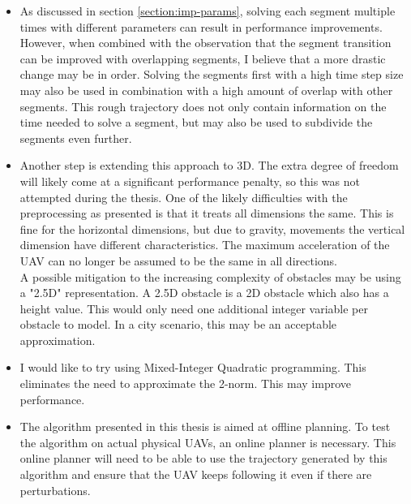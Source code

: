 \begin{itemize}
\item As discussed in section \ref{section:imp-params}, solving each segment multiple times with different parameters can result in performance improvements. However, when combined with the observation that the segment transition can be improved with overlapping segments, I believe that a more drastic change may be in order. Solving the segments first with a high time step size may also be used in combination with a high amount of overlap with other segments. This rough trajectory does not only contain information on the time needed to solve a segment, but may also be used to subdivide the segments even further.
\item Another step is extending this approach to 3D. The extra degree of freedom will likely come at a significant performance penalty, so this was not attempted during the thesis. One of the likely difficulties with the preprocessing as presented is that it treats all dimensions the same. This is fine for the horizontal dimensions, but due to gravity, movements the vertical dimension have different characteristics. The maximum acceleration of the UAV can no longer be assumed to be the same in all directions.\\
A possible mitigation to the increasing complexity of obstacles may be using a "2.5D" representation. A 2.5D obstacle is a 2D obstacle which also has a height value. This would only need one additional integer variable per obstacle to model. In a city scenario, this may be an acceptable approximation.
\item I would like to try using Mixed-Integer Quadratic programming. This eliminates the need to approximate the 2-norm. This may improve performance. \\
\item The algorithm presented in this thesis is aimed at offline planning. To test the algorithm on actual physical UAVs, an online planner is necessary. This online planner will need to be able to use the trajectory generated by this algorithm and ensure that the UAV keeps following it even if there are perturbations.
\end{itemize}

